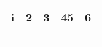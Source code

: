 \begin{tabular}{ c c c c c }
    i & 2 & 3 & 45 & 6 \\ 
    \hline \\
     &  &  &  &  \\ 
     &  &  &  &  \\ 
\end{tabular}